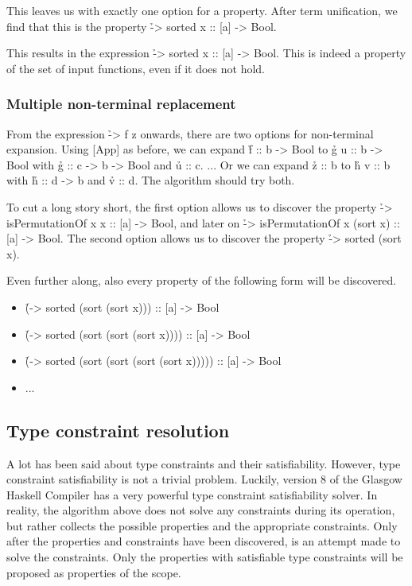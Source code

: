 \documentclass[a4paper, 11pt]{article}
\begin{document}
This leaves us with exactly one option for a property.
After term unification, we find that this is the property \h{\x -> sorted x :: [a] -> Bool}.

This results in the expression \h{\a -> sorted x :: [a] -> Bool}.
This is indeed a property of the set of input functions, even if it does not hold.


\subsubsection{Multiple non-terminal replacement}

From the expression \h{\x -> f z} onwards, there are two options for non-terminal expansion.
Using [App] as before, we can expand \h{f :: b -> Bool} to \h{g u :: b -> Bool} with \h{g :: c -> b -> Bool} and \h{u :: c}.
... Or we can expand \h{z :: b} to \h{h v :: b} with \h{h :: d -> b} and \h{v :: d}.
The algorithm should try both.

To cut a long story short, the first option allows us to discover the property \h{\x -> isPermutationOf x x :: [a] -> Bool}, and later on \h{\x -> isPermutationOf x (sort x) :: [a] -> Bool}.
The second option allows us to discover the property \h{\x -> sorted (sort x)}.

Even further along, also every property of the following form will be discovered.

\begin{itemize}
  \item \h{(\x -> sorted (sort (sort x))) :: [a] -> Bool}
  \item \h{(\x -> sorted (sort (sort (sort x)))) :: [a] -> Bool}
  \item \h{(\x -> sorted (sort (sort (sort (sort x))))) :: [a] -> Bool}
  \item ...
\end{itemize}


\subsection{Type constraint resolution}

A lot has been said about type constraints and their satisfiability.
However, type constraint satisfiability is not a trivial problem.
Luckily, version 8 of the Glasgow Haskell Compiler \cite{ghc8} has a very powerful type constraint satisfiability solver\cite{gadtsMeetTheirMatch}.
In reality, the algorithm above does not solve any constraints during its operation, but rather collects the possible properties and the appropriate constraints.
Only after the properties and constraints have been discovered, is an attempt made to solve the constraints.
Only the properties with satisfiable type constraints will be proposed as properties of the scope.
\end{document}
